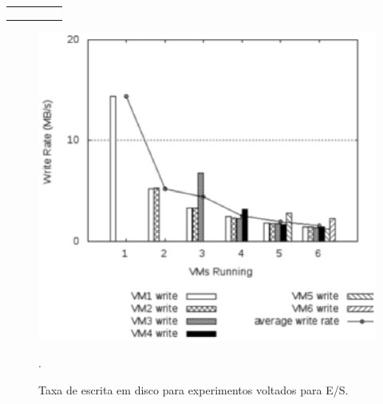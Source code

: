 \begin{table}[H]
{\begin{tabular}{lllll}
                                             &                                      &                                 &                                                                                                                                                  &  \\
                                             &                                      &                                 &                                                                                                                                                  &  \\
                                             &                                      &                                 &                                                                                                                                                  & 
\end{tabular}}
\end{table}

\begin{figure}[!htb]
\centering
\includegraphics [keepaspectratio=true,scale=0.65]{figuras/iobound_experiments.eps}
\caption{Taxa de escrita em disco para experimentos voltados para E/S.}
\cite{popiolek2012}.
\label{iobound_experiments}
\end{figure}

